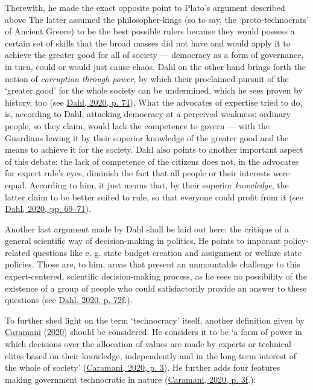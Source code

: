 \documentclass[
  12pt,
  english,
]{article}
\begin{document}
Therewith, he made the exact opposite point to Plato's argument
described above The latter assumed the philosopher-kings (so to say, the
`proto-technocrats' of Ancient Greece) to be the best possible rulers
because they would possess a certain set of skills that the broad masses
did not have and would apply it to achieve the greater good for all of
society --- democracy as a form of governance, in turn, could or would
just cause chaos. Dahl on the other hand brings forth the notion of
\emph{corruption through power}, by which their proclaimed pursuit of
the `greater good' for the whole society can be undermined, which he
sees proven by history, too (see
\protect\hyperlink{ref-dahl_onDemocracy}{Dahl, 2020, p. 74}). What the
advocates of expertise tried to do, is, according to Dahl, attacking
democracy at a perceived weakness: ordinary people, so they claim, would
lack the competence to govern --- with the Guardians having it by their
superior knowledge of the greater good and the means to achieve it for
the society. Dahl also points to another important aspect of this
debate: the lack of competence of the citizens does not, in the
advocates for expert rule's eyes, diminish the fact that all people or
their interests were equal. According to him, it just means that, by
their superior \emph{knowledge}, the latter claim to be better suited to
rule, so that everyone could profit from it (see
\protect\hyperlink{ref-dahl_onDemocracy}{Dahl, 2020, pp. 69--71}).

Another last argument made by Dahl shall be laid out here: the critique
of a general scientific way of decision-making in politics. He points to
imporant policy-related questions like e. g. state budget creation and
assignment or welfare state policies. Those are, to him, areas that
present an unmountable challenge to this expert-centered, scientific
decision-making process, as he sees no possibility of the existence of a
group of people who could satisfactorily provide an answer to these
questions (see \protect\hyperlink{ref-dahl_onDemocracy}{Dahl, 2020, p.
72f}.).

To further shed light on the term `technocracy' itself, another
definition given by
\protect\hyperlink{ref-caramani2020technocratic}{Caramani}
(\protect\hyperlink{ref-caramani2020technocratic}{2020}) should be
considered. He considers it to be `a form of power in which decisions
over the allocation of values are made by experts or technical elites
based on their knowledge, independently and in the long-term interest of
the whole of society'
(\protect\hyperlink{ref-caramani2020technocratic}{Caramani, 2020, p.
3}). He further adds four features making government technocratic in
nature (\protect\hyperlink{ref-caramani2020technocratic}{Caramani, 2020,
p. 3f}.):
\end{document}
